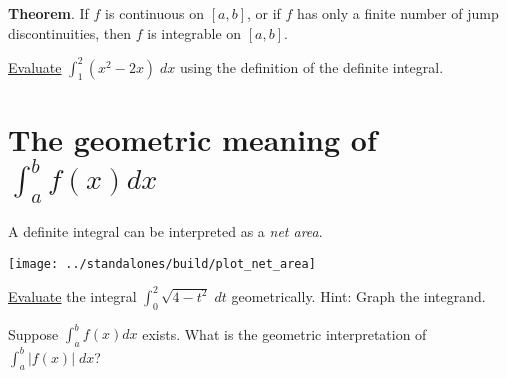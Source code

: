 \documentclass[../main.tex]{subfiles}
\begin{document}
\begin{mdframed}[style=withref]
  \textbf{Theorem}. If \(f\) is continuous on \([a,b]\), or if \(f\) has only a finite number of jump discontinuities, then \(f\) is integrable on \([a,b]\).

\end{mdframed}
\bigskip

\clearpage
\begin{example}
  \href{https://www.wolframalpha.com/input?i=integrate+x%5E2+-+2x+dx+from+1+to+2}{Evaluate} \(\int_{1}^{2} (x^{2} - 2x) \; dx\) using the definition of the definite integral.
\end{example}
\clearpage

\section{The geometric meaning of \texorpdfstring{\(\int_{a}^{b} f(x) dx\)}{definite integrals}}


\vspace{1in}

A definite integral can be interpreted as a \emph{net area}.

\texttt{[image: ../standalones/build/plot\_net\_area]}
\vspace{1in}

\begin{example}
  \href{https://www.wolframalpha.com/input?i=integrate+sqrt%284+-+t%5E2%29+from+0+to+2}{Evaluate} the integral \(\int_{0}^{2} \sqrt{4 - t^{2}} \;dt\) geometrically. Hint: Graph the integrand.
\end{example}

\vspace{1in}

\begin{example}
  Suppose \(\int_{a}^{b} f(x) dx\) exists. What is the geometric interpretation of \(\int_{a}^{b} |f(x)| \; dx\)?
\end{example}
\end{document}
